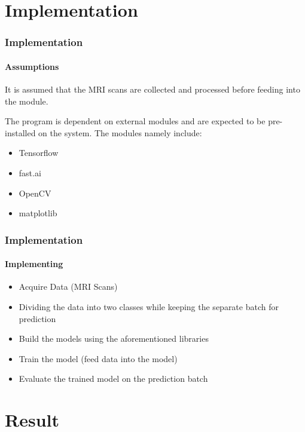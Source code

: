 \documentclass[10pt, aspectratio=169]{beamer}
\begin{document}
	\section{Implementation}

	\begin{frame}
		\frametitle{Implementation}
		\framesubtitle{Assumptions}

		It is assumed that the MRI scans are collected and processed before
		feeding into the module.

		\vspace{1cm}

		The program is dependent on external modules and are expected to be
		pre-installed on the system. The modules namely include:

		\vspace{1cm}

		\begin{itemize}
			\item Tensorflow
			\item fast.ai
			\item OpenCV
			\item matplotlib
		\end{itemize}
	\end{frame}

	\begin{frame}
		\frametitle{Implementation}
		\framesubtitle{Implementing}

		\begin{itemize}
			\item Acquire Data (MRI Scans)
			\item Dividing the data into two classes while keeping the separate
				batch for prediction
			\item Build the models using the aforementioned libraries
			\item Train the model (feed data into the model)
			\item Evaluate the trained model on the prediction batch
		\end{itemize}
	\end{frame}

	\section{Result}
\end{document}
